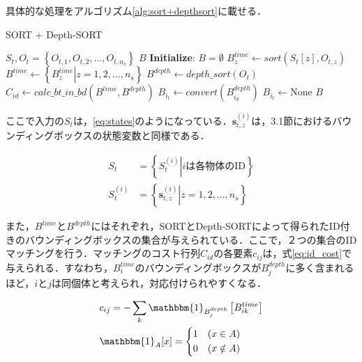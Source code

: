 具体的な処理をアルゴリズム\ref{alg:sort+depthsort}に載せる．

\begin{algorithm}[t]
    \caption{SORT + Depth-SORT}
    \label{alg:sort+depthsort}
    \begin{algorithmic}[1]
        \REQUIRE $S_t, O_t = \left\{ O_{t,1}, O_{t,2}, ..., O_{t,n_s} \right\}$
        \ENSURE $B$ 
        \STATE \textbf{Initialize}: $B = \emptyset$
            \STATE $B_z^{time} \leftarrow sort(S_t[z], O_{t,z})$ 
        \ENDFOR
        \STATE $B^{time} \leftarrow \left\{ \left. B_z^{time} \right| z = 1,2,...,n_s \right\}$
        \STATE $B^{depth} \leftarrow depth\_sort(O_t)$ 
        \STATE $C_{id} \leftarrow calc\_bt\_in\_bd(B^{time}, B^{depth})$
                \STATE $B_{i_t} \leftarrow convert(B^{depth}_{i_d})$
            \ELSE
                \STATE $B_{i_t} \leftarrow \textrm{None}$
            \ENDIF
        \ENDFOR
        \RETURN $B$
    \end{algorithmic}
\end{algorithm}

ここで入力の$S_t$は，\ref{eq:states}のようになっている．$\bm{s}^{(i)}_{t,z}$は，3.1節におけるバウンディングボックスの状態変数と同様である．

\begin{equation}
    \label{eq:states}
    \begin{aligned}
        S_t &= \left\{ \left. S_t^{(i)} \right| \text{$i$は各物体のID} \right\}
        \\ S_t^{(i)} &= \left\{ \left. \bm{s}_{t,z}^{(i)} \right| z = 1,2,...,n_s \right\}
    \end{aligned}
\end{equation}

また，$B^{time}$と$B^{depth}$にはそれぞれ，SORTとDepth-SORTによって得られたID付きのバウンディングボックスの集合が与えられている．ここで，２つの集合のIDマッチングを行う．マッチングのコスト行列$C_{id}$の各要素$c_{ij}$は，式\ref{eq:id_cost}で与えられる．すなわち，$B^{time}_i$のバウンディングボックスが$B^{depth}_j$に多く含まれるほど，$i$と$j$は同個体と考えられ，対応付けられやすくなる．

\begin{equation}
    \label{eq:id_cost}
    \begin{aligned}
        &c_{ij} = - \sum_k \mathbbm{1}_{B_j^{depth}}\left[ B_{ik}^{time} \right]
        \\&\mathbbm{1}_{A}[x] = \left\{
        \begin{gathered}
            1 \quad (x \in A)
            \\0 \quad (x \notin A)
        \end{gathered}
        \right.
    \end{aligned}
\end{equation}

